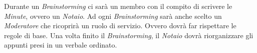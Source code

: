 \documentclass[a4paper]{article}
\begin{document}
		Durante un \emph{Brainstorming} ci sarà un membro con il compito di scrivere le \emph{Minute}, ovvero un \emph{Notaio}.
		Ad ogni \emph{Brainstorming} sarà anche scelto un \emph{Moderatore} che ricoprirà un ruolo di servizio. Ovvero dovrà far
		rispettare le regole di base. Una volta finito il \emph{Brainstorming}, il \emph{Notaio} dovrà riorganizzare gli appunti
		presi in un verbale ordinato.

	\cleardoublepage
	\listoffigures

	\cleardoublepage
	\listoftables
\end{document}
